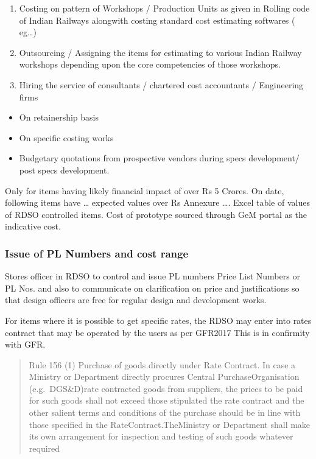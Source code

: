 \documentclass[
  11pt,
  twoside]{article}
\providecommand{\tightlist}{%
  \setlength{\itemsep}{0pt}\setlength{\parskip}{0pt}}
\begin{document}
\begin{enumerate}
\def\labelenumi{\arabic{enumi}.}
\item
  Costing on pattern of Workshops / Production Units as given in Rolling code of Indian Railways alongwith costing standard cost estimating softwares ( eg\ldots)
\item
  Outsourcing / Assigning the items for estimating to various Indian Railway workshops depending upon the core competencies of those workshops.
\item
  Hiring the service of consultants / chartered cost accountants / Engineering firms
\end{enumerate}

\begin{itemize}
\tightlist
\item
  On retainership basis
\item
  On specific costing works
\item
  Budgetary quotations from prospective vendors during specs development/ post specs development.
\end{itemize}

Only for items having likely financial impact of over Rs 5 Crores.
On date, following items have \ldots{} expected values over Rs Annexure \ldots. Excel table of values of RDSO controlled items.
Cost of prototype sourced through GeM portal as the indicative cost.

\hypertarget{issue-of-pl-numbers-and-cost-range}{%
\subsubsection{Issue of PL Numbers and cost range}\label{issue-of-pl-numbers-and-cost-range}}

Stores officer in RDSO to control and issue PL numbers Price List Numbers or PL Nos. and also to communicate on clarification on price and justifications so that design officers are free for regular design and development works.

For items where it is possible to get specific rates, the RDSO may enter into rates contract that may be operated by the users as per GFR2017
This is in confirmity with GFR.

\begin{quote}
Rule 156 (1) Purchase of goods directly under Rate Contract.
In case a Ministry or Department directly procures Central PurchaseOrganisation (e.g.~DGS\&D)rate contracted goods from suppliers, the prices to be paid for such goods shall not exceed those stipulated the rate contract and the other salient terms and conditions of the purchase should be in line with those specified in the RateContract.TheMinistry or Department shall make its own arrangement for inspection and testing of such goods whatever required
\end{quote}
\end{document}
